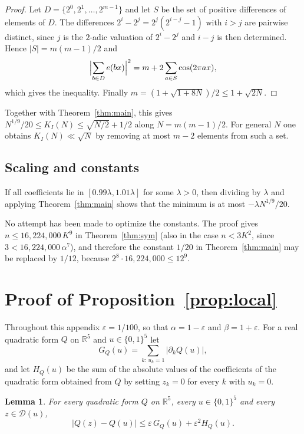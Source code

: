 \documentclass{amsart}
\newtheorem{lemma}[theorem]{Lemma}
\theoremstyle{remark}
\numberwithin{equation}{section}
\numberwithin{table}{section}
\newcommand{\R}{\mathbb{R}}
\newcommand{\D}{\mathcal{D}}
\begin{document}
\begin{proof}
Let $D=\{2^0,2^1,\dots,2^{m-1}\}$ and let $S$ be the set of positive differences of elements of $D$. The differences $2^i-2^j=2^j(2^{i-j}-1)$ with $i>j$ are pairwise distinct, since $j$ is the $2$-adic valuation of $2^i-2^j$ and $i-j$ is then determined. Hence $|S|=m(m-1)/2$ and
\[
\Bigl|\sum_{b\in D}e(bx)\Bigr|^2=m+2\sum_{a\in S}\cos(2\pi ax),
\]
which gives the inequality. Finally $m=(1+\sqrt{1+8N})/2\le1+\sqrt{2N}$.
\end{proof}

Together with Theorem~\ref{thm:main}, this gives $N^{1/9}/20\le K_I(N)\le\sqrt{N/2}+1/2$ along $N=m(m-1)/2$. For general $N$ one obtains $K_I(N)\ll\sqrt N$ by removing at most $m-2$ elements from such a set.

\subsection{Scaling and constants}
If all coefficients lie in $[0.99\lambda,1.01\lambda]$ for some $\lambda>0$, then dividing by $\lambda$ and applying Theorem~\ref{thm:main} shows that the minimum is at most $-\lambda N^{1/9}/20$.

No attempt has been made to optimize the constants. The proof gives $n\le16{,}224{,}000\,K^9$ in Theorem~\ref{thm:sym} (also in the case $n<3K^2$, since $3<16{,}224{,}000\,\alpha^7$), and therefore the constant $1/20$ in Theorem~\ref{thm:main} may be replaced by $1/12$, because $2^8\cdot16{,}224{,}000\le12^9$.

\appendix

\section{Proof of Proposition~\ref{prop:local}}\label{app:cert}

Throughout this appendix $\varepsilon=1/100$, so that $\alpha=1-\varepsilon$ and $\beta=1+\varepsilon$. For a real quadratic form $Q$ on $\R^5$ and $u\in\{0,1\}^5$ let
\[
G_Q(u)=\sum_{k:\,u_k=1}\bigl|\partial_kQ(u)\bigr|,
\]
and let $H_Q(u)$ be the sum of the absolute values of the coefficients of the quadratic form obtained from $Q$ by setting $z_k=0$ for every $k$ with $u_k=0$.

\begin{lemma}\label{lem:taylor}
For every quadratic form $Q$ on $\R^5$, every $u\in\{0,1\}^5$ and every $z\in\D(u)$,
\[
\bigl|Q(z)-Q(u)\bigr|\le\varepsilon\,G_Q(u)+\varepsilon^2H_Q(u).
\]
\end{lemma}
\end{document}
